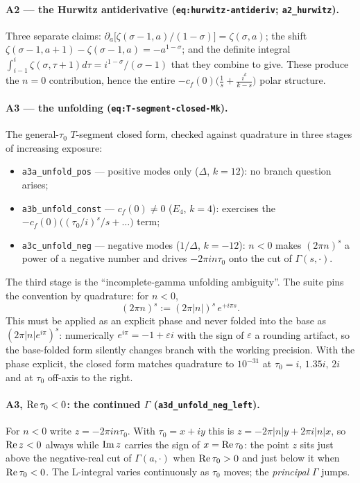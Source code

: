 \documentclass[11pt]{article}
\newcommand{\code}[1]{\texttt{#1}}
\begin{document}
\paragraph{A2 --- the Hurwitz antiderivative (\code{eq:hurwitz-antideriv}; \code{a2\_hurwitz}).}
Three separate claims: $\partial_a\big[\zeta(\sigma-1,a)/(1-\sigma)\big]=\zeta(\sigma,a)$; the
shift $\zeta(\sigma-1,a+1)-\zeta(\sigma-1,a)=-a^{1-\sigma}$; and the definite integral
$\int_{i-1}^{i}\zeta(\sigma,\tau+1)d\tau=i^{1-\sigma}/(\sigma-1)$ that they combine to give.
These produce the $n=0$ contribution, hence the entire
$-c_f(0)\big(\tfrac1s+\tfrac{i^k}{k-s}\big)$ polar structure.

\paragraph{A3 --- the unfolding (\code{eq:T-segment-closed-Mk}).}
The general-$\tau_0$ $T$-segment closed form, checked against quadrature in three stages of
increasing exposure:
\begin{itemize}
\item \code{a3a\_unfold\_pos} --- positive modes only ($\Delta$, $k=12$): no branch question arises;
\item \code{a3b\_unfold\_const} --- $c_f(0)\neq0$ ($E_4$, $k=4$): exercises the
      $-c_f(0)\big((\tau_0/i)^s/s+\dots\big)$ term;
\item \code{a3c\_unfold\_neg} --- negative modes ($1/\Delta$, $k=-12$): $n<0$ makes $(2\pi n)^s$ a power of a negative
number and drives $-2\pi in\tau_0$ onto the cut of $\Gamma(s,\cdot)$.
\end{itemize}

The third stage is the ``incomplete-gamma unfolding ambiguity''. The suite pins the convention
by quadrature: for $n<0$,
\[
(2\pi n)^s := (2\pi|n|)^s\,e^{+i\pi s}.
\]
This must be applied as an explicit phase and never folded into the base as
$(2\pi|n|e^{i\pi})^s$: numerically $e^{i\pi}=-1+\varepsilon i$ with the sign of $\varepsilon$ a
rounding artifact, so the base-folded form silently changes branch with the working precision.
With the phase explicit, the closed form matches quadrature to $10^{-31}$ at
$\tau_0=i,\,1.35i,\,2i$ and at $\tau_0$ off-axis to the right.

\paragraph{A3, ${\rm Re}\,\tau_0<0$: the continued $\Gamma$ (\code{a3d\_unfold\_neg\_left}).}
For $n<0$ write $z=-2\pi in\tau_0$. With $\tau_0=x+iy$ this is
$z=-2\pi|n|y+2\pi i|n|x$, so ${\rm Re}\,z<0$ always while ${\rm Im}\,z$ carries the sign of
$x={\rm Re}\,\tau_0$: the point $z$ sits just above the negative-real cut of $\Gamma(a,\cdot)$
when ${\rm Re}\,\tau_0>0$ and just below it when ${\rm Re}\,\tau_0<0$. The L-integral varies
continuously as $\tau_0$ moves; the \emph{principal} $\Gamma$ jumps.
\end{document}
